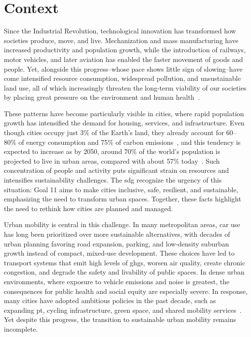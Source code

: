 \section{Context}
\label{sec:context}

Since the Industrial Revolution, technological innovation has transformed how societies produce, move, and live. Mechanization and mass manufacturing have increased productivity and population growth, while the introduction of railways, motor vehicles, and later aviation has enabled the faster movement of goods and people. Yet, alongside this progress--whose pace shows little sign of slowing--have come intensified resource consumption, widespread pollution, and unsustainable land use, all of which increasingly threaten the long-term viability of our societies by placing great pressure on the environment and human health~\cite{IPCC2023, UNEP2023}. 

These patterns have become particularly visible in cities, where rapid population growth has intensified the demand for housing, services, and infrastructure. Even though cities occupy just 3\% of the Earth's land, they already account for 60–80\% of energy consumption and 75\% of carbon emissions~\cite{UN_SDG11_2015}, and this tendency is expected to increase as by 2050, around 70\% of the world’s population is projected to live in urban areas, compared with about 57\% today~\cite{UN_SDG11_2015}. Such concentration of people and activity puts significant strain on resources and intensifies sustainability challenges. The \ac{sdg} recognize the urgency of this situation: Goal 11 aims to make cities inclusive, safe, resilient, and sustainable, emphasizing the need to transform urban spaces. Together, these facts highlight the need to rethink how cities are planned and managed.

Urban mobility is central in this challenge. In many metropolitan areas, car use has long been prioritized over more sustainable alternatives, with decades of urban planning favoring road expansion, parking, and low-density suburban growth instead of compact, mixed-use development. These choices have led to transport systems that emit high levels of \acp{ghg}, worsen air quality, create chronic congestion, and degrade the safety and livability of public spaces. In dense urban environments, where exposure to vehicle emissions and noise is greatest, the consequences for public health and social equity are especially severe. In response, many cities have adopted ambitious policies in the past decade, such as expanding \ac{pt}, cycling infrastructure, green space, and shared mobility services~\cite{UNHabitat2020}. Yet despite this progress, the transition to sustainable urban mobility remains incomplete.

